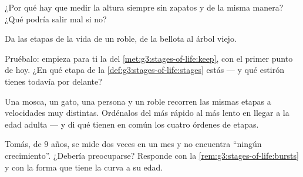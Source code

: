 \begin{exercise}[$\star$]\label{exo:g3:stages-of-life:6}
¿Por qué hay que medir la altura siempre sin zapatos y de la misma
manera? ¿Qué podría salir mal si no?
\end{exercise}

\begin{exercise}[$\star$]\label{exo:g3:stages-of-life:7}
Da las etapas de la vida de un roble, de la bellota al árbol viejo.
\end{exercise}

\begin{exercise}[$\star$]\label{exo:g3:stages-of-life:8}
Pruébalo: empieza para ti la  del
\cref{met:g3:stages-of-life:keep}, con el primer punto de hoy. ¿En qué
etapa de la \cref{def:g3:stages-of-life:stages} estás --- y qué
estirón tienes todavía por delante?
\end{exercise}

\begin{exercise}[$\star\star$]\label{exo:g3:stages-of-life:9}
Una mosca, un gato, una persona y un roble recorren las mismas etapas
a velocidades muy distintas. Ordénalos del más rápido al más lento en
llegar a la edad adulta --- y di qué tienen en común los cuatro
órdenes de etapas.
\end{exercise}

\begin{exercise}[$\star\star$]\label{exo:g3:stages-of-life:10}
Tomás, de $9$ años, se mide dos veces en un mes y no encuentra
``ningún crecimiento''. ¿Debería preocuparse? Responde con la
\cref{rem:g3:stages-of-life:bursts} y con la forma que tiene la curva
a su edad.
\end{exercise}
